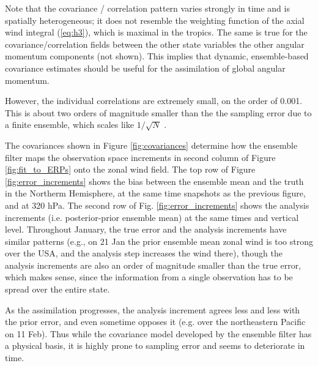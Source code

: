 Note that the covariance / correlation pattern varies strongly in time and is spatially heterogeneous; it does not resemble the weighting function of the axial wind integral (\ref{eq:h3}), which is maximal in the tropics.
The same is true for the covariance/correlation fields between the other state variables the other angular momentum components (not shown).
This implies that dynamic, ensemble-based covariance estimates should be useful for the assimilation of global angular momentum. 

However, the individual correlations are extremely small, on the order of 0.001. 
This is about two orders of magnitude smaller than the the sampling error due to a finite ensemble, which scales like $1/\sqrt{N}$ \citep{Houtekamer1998}.  

The covariances shown in Figure \ref{fig:covariances} determine how the ensemble filter maps the observation space increments in second column of Figure \ref{fig:fit_to_ERPs} onto the zonal wind field. 
The top row of Figure \ref{fig:error_increments} shows the bias between the ensemble mean and the truth in the Northerm Hemisphere, at the same time snapshots as the previous figure, and at 320 hPa. 
The second row of Fig. \ref{fig:error_increments} shows the analysis increments (i.e. posterior-prior ensemble mean) at the same times and vertical level. 
Throughout January, the true error and the analysis increments have similar patterns (e.g., on 21 Jan the prior ensemble mean zonal wind is too strong over the USA, and the analysis step increases the wind there), though 
the analysis increments are also an order of magnitude smaller than the true error, which makes sense, since the information from a single observation has to be spread over the entire state. 

As the assimilation progresses, the analysis increment agrees less and less with the prior error, and even sometime opposes it (e.g. over the northeastern Pacific on 11 Feb). 
Thus while the covariance model developed by the ensemble filter has a physical basis, it is highly prone to sampling error and seems to deteriorate in time. 

